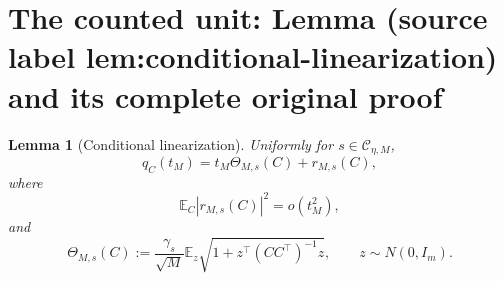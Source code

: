 \documentclass[10pt,a4paper]{amsart}
\newcommand{\Ebb}{\mathbb E}
\theoremstyle{plain}
\newtheorem{lemma}{Lemma}
\begin{document}
\section{The counted unit: Lemma (source label lem:conditional-linearization) and its complete original proof}

\begin{lemma}[Conditional linearization]
\label{lem:conditional-linearization}
Uniformly for \(s\in\mathcal C_{\eta,M}\),
\begin{equation}
        q_C(t_M)
        =
        t_M\Theta_{M,s}(C)+r_{M,s}(C),
        \label{eq:conditional-linearization}
\end{equation}
where
\begin{equation}
        \Ebb_C|r_{M,s}(C)|^2=o(t_M^2),
        \label{eq:conditional-remainder-L2}
\end{equation}
and
\begin{equation}
        \Theta_{M,s}(C)
        :=
        \frac{\gamma_s}{\sqrt M}
        \Ebb_z
        \sqrt{1+z^\top(CC^\top)^{-1}z},
        \qquad
        z\sim N(0,I_m).
        \label{eq:theta-def}
\end{equation}
\end{lemma}
\end{document}

